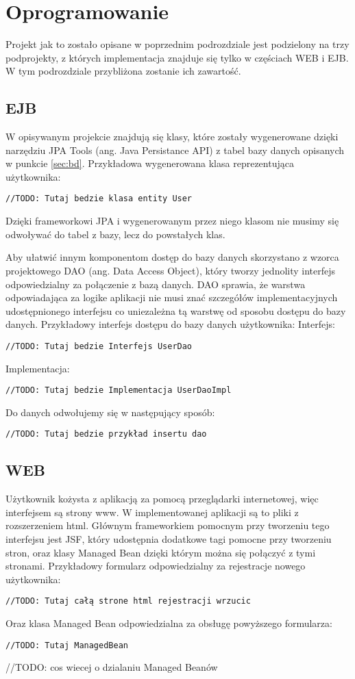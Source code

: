\section{Oprogramowanie}
Projekt jak to zostało opisane w poprzednim podrozdziale jest podzielony na trzy podprojekty, z których implementacja znajduje się tylko w częściach WEB i EJB. W tym podrozdziale przybliżona zostanie ich zawartość.
\subsection{EJB}
W opisywanym projekcie znajdują się klasy, które zostały wygenerowane dzięki narzędziu JPA Tools (ang. Java Persistance API) z tabel bazy danych opisanych w punkcie \ref{sec:bd}. Przykładowa wygenerowana klasa reprezentująca użytkownika:
\begin{lstlisting}
//TODO: Tutaj bedzie klasa entity User
\end{lstlisting}
Dzięki frameworkowi JPA i wygenerowanym przez niego klasom nie musimy się odwoływać do tabel z bazy, lecz do powstałych klas.

Aby ułatwić innym komponentom dostęp do bazy danych skorzystano z wzorca projektowego DAO (ang. Data Access Object), który tworzy jednolity interfejs odpowiedzialny za połączenie z bazą danych. DAO sprawia, że warstwa odpowiadająca za logike aplikacji nie musi znać szczegółów implementacyjnych udostępnionego interfejsu co uniezależna tą warstwę od sposobu dostępu do bazy danych.
Przykładowy interfejs dostępu do bazy danych użytkownika:
Interfejs:
\begin{lstlisting}
//TODO: Tutaj bedzie Interfejs UserDao
\end{lstlisting}
Implementacja:
\begin{lstlisting}
//TODO: Tutaj bedzie Implementacja UserDaoImpl
\end{lstlisting}
Do danych odwołujemy się w następujący sposób:
\begin{lstlisting}
//TODO: Tutaj bedzie przykład insertu dao
\end{lstlisting}

\subsection{WEB}
Użytkownik kożysta z aplikacją za pomocą przeglądarki internetowej, więc interfejsem są strony www. W implementowanej aplikacji są to pliki z rozszerzeniem html. Głównym frameworkiem pomocnym przy tworzeniu tego interfejsu jest JSF, który udostępnia dodatkowe tagi pomocne przy tworzeniu stron, oraz klasy Managed Bean dzięki którym można się połączyć z tymi stronami.
Przykładowy formularz odpowiedzialny za rejestracje nowego użytkownika:
\begin{lstlisting}
//TODO: Tutaj całą strone html rejestracji wrzucic
\end{lstlisting}
Oraz klasa Managed Bean odpowiedzialna za obsługę powyższego formularza:
\begin{lstlisting}
//TODO: Tutaj ManagedBean
\end{lstlisting}
//TODO: cos wiecej o dzialaniu Managed Beanów\\
